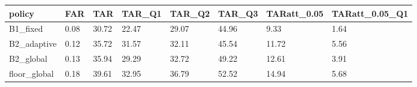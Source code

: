 \begin{tabular}{llllllll}
\hline
policy & FAR & TAR & TAR\_Q1 & TAR\_Q2 & TAR\_Q3 & TARatt\_0.05 & TARatt\_0.05\_Q1 \\
\hline
B1\_fixed & 0.08 & 30.72 & 22.47 & 29.07 & 44.96 & 9.33 & 1.64 \\
B2\_adaptive & 0.12 & 35.72 & 31.57 & 32.11 & 45.54 & 11.72 & 5.56 \\
B2\_global & 0.13 & 35.94 & 29.29 & 32.72 & 49.22 & 12.61 & 3.91 \\
floor\_global & 0.18 & 39.61 & 32.95 & 36.79 & 52.52 & 14.94 & 5.68 \\
\hline
\end{tabular}
